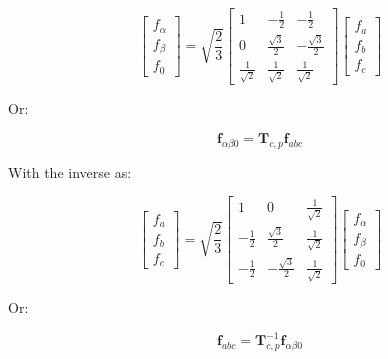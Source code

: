 \documentclass{article}
\begin{document}
\begin{equation}
    \begin{bmatrix}
        f_{\alpha} \\
        f_{\beta} \\
        f_{0}
    \end{bmatrix}
    =
    \sqrt{\frac{2}{3}}
    \begin{bmatrix}
        1 & -\frac{1}{2} & -\frac{1}{2} \\[2mm]
        0 & \frac{\sqrt{3}}{2} & -\frac{\sqrt{3}}{2} \\[2mm]
        \frac{1}{\sqrt{2}} & \frac{1}{\sqrt{2}} & \frac{1}{\sqrt{2}}
    \end{bmatrix}
    \begin{bmatrix}
        f_a \\
        f_b \\
        f_c
    \end{bmatrix}
\end{equation}

Or:

\begin{equation}
    \mathbf{f}_{\alpha\beta0} = \mathbf{T}_{c,p} \mathbf{f}_{abc}
\end{equation}

With the inverse as:

\begin{equation}
    \begin{bmatrix}
        f_a \\
        f_b \\
        f_c
    \end{bmatrix}
    =
    \sqrt{\frac{2}{3}}
    \begin{bmatrix}
        1 & 0 & \frac{1}{\sqrt{2}} \\[2mm]
        -\frac{1}{2} & \frac{\sqrt{3}}{2} & \frac{1}{\sqrt{2}} \\[2mm]
        -\frac{1}{2} & -\frac{\sqrt{3}}{2} & \frac{1}{\sqrt{2}}
    \end{bmatrix}
    \begin{bmatrix}
        f_{\alpha} \\
        f_{\beta} \\
        f_0
    \end{bmatrix}
\end{equation}

Or:

\begin{equation}
    \mathbf{f}_{abc} = \mathbf{T}_{c,p}^{-1} \mathbf{f}_{\alpha\beta0}
\end{equation}
\end{document}
